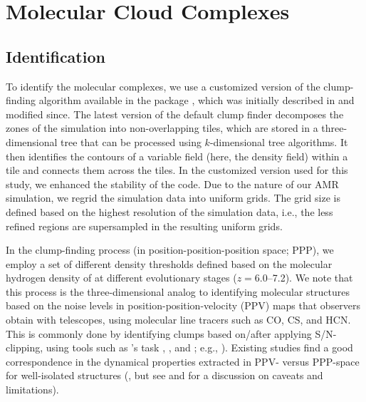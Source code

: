\IfFileExists{emulateapjlegacy.cls}{\documentclass[iop]{emulateapjlegacy}}{\documentclass[iop]{emulateapj}}
\begin{document}
\section{Molecular Cloud Complexes}\label{sec:eqn}

\subsection{Identification}\label{sec:method}

To identify the molecular complexes, we use a customized version of the clump-finding algorithm available in the  package  \citep{Turk11a}, which was initially described in \citet{Smith09a} and modified since.
%
The latest version of the default  clump finder decomposes the zones of the simulation into non-overlapping tiles, which are stored in a three-dimensional tree that can be processed using $k$-dimensional tree algorithms. It then identifies the contours of a variable field (here, the density field) within a tile and connects them across the tiles. In the customized version used for this study, we enhanced the stability of the code.
%
Due to the nature of our AMR simulation, we regrid the simulation data into uniform grids. The grid size is defined based on the highest resolution of the simulation data, i.e., the less refined regions are supersampled in the resulting uniform grids.

In the clump-finding process (in position-position-position space; PPP), we employ a set of different density thresholds defined based on the molecular hydrogen density of \flower at different evolutionary stages ($z=6.0$--7.2).
%
We note that this process is the three-dimensional analog to identifying molecular structures based on the noise levels in position-position-velocity (PPV) maps that observers obtain with telescopes, using molecular line tracers such as CO, CS, and HCN. This is commonly done by
identifying clumps based on/after applying S/N-clipping, using tools such as 's task , , and ; e.g., \citealt{Williams94a, Oka01a, Rosolowsky06a, Rosolowsky08a, DonovanMeyer13a}).
%
Existing studies find a good correspondence in the dynamical properties extracted in PPV- versus PPP-space for well-isolated structures (\citealt{Ballesteros-Paredes02a, Heitsch09a, Shetty10a, Beaumont13a, Pan15a}, but see \citealt{Ballesteros-Paredes02a} and \citealt{Shetty10a} for a discussion on caveats and limitations).
\end{document}
